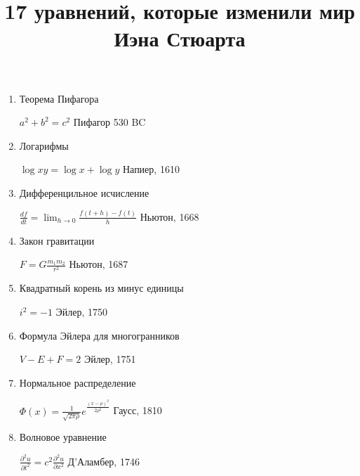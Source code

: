\documentclass[12pt]{article}
\date{}
\title{\bf 17 уравнений, которые изменили мир \\Иэна Стюарта\\}
\begin{document}
 

\maketitle
\begin{enumerate}
 \item Теорема Пифагора \hfill \begin{minipage}[t]{100mm} $a^2+b^2 = c^2$ \hfill Пифагор 530 BC \end{minipage}
 \item Логарифмы  \hfill \begin{minipage}[t]{100mm} $\log xy = \log x+\log y$ \hfill Напиер, 1610 \end{minipage} 
 \item Дифференцильное исчисление \hfill \begin{minipage}[t]{100mm} $\frac{df}{dt} = \lim_{h \to 0}\frac {f(t+h)-f(t)}{h} $ \hfill Ньютон, 1668 \end{minipage}
 \item   Закон гравитации \hfill \begin{minipage}[t]{100mm} $F = G \frac{m_1m_2}{r^2}$ \hfill Ньютон, 1687 \end{minipage}
 \item \noindent
  \begin{minipage}[t]{45mm} Квадратный корень из минус единицы \end{minipage}
  \hfill
  \begin{minipage}[t]{100mm}  $i^2 = -1$ \hfill Эйлер, 1750 \end{minipage}
 \item \noindent
  \begin{minipage}[t]{45mm} Формула Эйлера для многогранников \end{minipage}
  \hfill 
  \begin{minipage}[t]{100mm}  $V - E + F = 2$ \hfill Эйлер, 1751 \end{minipage}
 \item Нормальное распределение \hfill \begin{minipage}[t]{100mm} $\Phi(x) = \frac{1}{\sqrt{2\pi\rho}}e^\frac{(x-\rho)^2}{2\rho^2}$ \hfill Гаусс, 1810 \end{minipage}
 \item Волновое уравнение \hfill \begin{minipage}[t]{100mm} $\frac{\partial^2 u}{\partial t^2} = c^2 \frac{\partial^2 u}{\partial x^2}$ \hfill Д'Аламбер, 1746 \end{minipage}

\end{enumerate}
\end{document}
